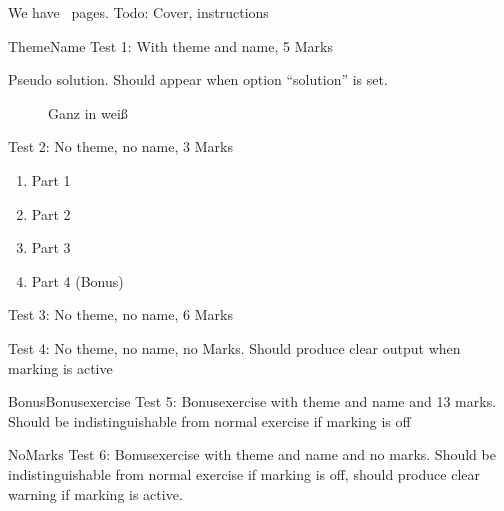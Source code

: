 \documentclass[pdftex,logo,midterm,formula]{newcsen}
\begin{document}
We have \Pages\ pages. Todo: Cover, instructions

\begin{exercise}{5}{Theme}{Name}
  Test 1: With theme and name, 5 Marks
  \begin{solution}
    Pseudo solution. Should appear when option ``solution'' is set.
  \end{solution}
\end{exercise}

\begin{figure}[ht]
  \centering
  \vspace*{3cm}
  \caption{Ganz in weiß}
  \label{fig:test}
\end{figure}

\begin{exercise}{3}{}{}
  Test 2: No theme, no name, 3 Marks
  \begin{enumerate}
  \item Part 1
  \item Part 2
  \item Part 3
  \item Part 4 (Bonus)
  \end{enumerate}
\end{exercise}

\begin{exercise}{6}{}{}
  Test 3: No theme, no name, 6 Marks
\end{exercise}

\begin{exercise}{}{}{}
  Test 4: No theme, no name, no Marks. Should produce clear output
  when marking is active
\end{exercise}

\begin{bonusexercise}{13}{Bonus}{Bonusexercise}
  Test 5: Bonusexercise with theme and name and 13 marks. Should be
  indistinguishable from normal exercise if marking is off
\end{bonusexercise}

\begin{bonusexercise}{}{No}{Marks}
  Test 6: Bonusexercise with theme and name and no marks. Should be
  indistinguishable from normal exercise if marking is off, should
  produce clear warning if marking is active.
\end{bonusexercise}
\end{document}
